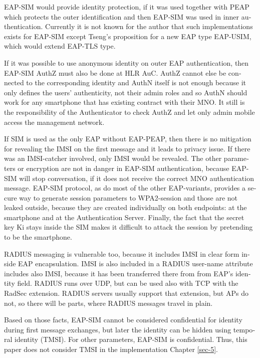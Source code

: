 \documentclass[12pt,a4paper,english]{tutthesis}
\begin{document}
\begin{otherlanguage}{english}
EAP-SIM would provide identity protection, if it was used together
with PEAP which protects the outer identification  and
then EAP-SIM was used in inner authentication.
Currently it is not known for the author that such implementations exists for
EAP-SIM  except Tseng's proposition\cite{tseng-usim} for a new EAP type
EAP-USIM, which would extend EAP-TLS type.

If it was possible to use anonymous identity on outer EAP
authentication, then EAP-SIM AuthZ must also be done at HLR AuC.
AuthZ cannot else be connected to the corresponding
identity and AuthN itself is not enough because it only defines the users'
authenticity, not their admin roles and so 
AuthN should work for any  smartphone that has existing contract with
their MNO. 
It still is the responsibility of the Authenticator to 
check AuthZ  and let only admin mobile access the management network.

If SIM is used as the only EAP without EAP-PEAP, then there is no
mitigation for revealing the IMSI on the first message and it leads to
privacy issue.  If there was an IMSI-catcher involved, only IMSI would
be revealed.  The other parameters or encryption are not in danger in
EAP-SIM authentication, because EAP-SIM will stop conversation, if it
does not receive the correct MNO authentication message.  EAP-SIM
protocol, as do most of the other EAP-variants, provides a secure way
to generate session parameters to WPA2-session and those are not
leaked outside, because they are created individually on both
endpoints: at the smartphone and at the Authentication Server.
Finally, the fact that the secret key Ki stays inside the SIM makes it
difficult to attack the session by pretending to be the smartphone.






RADIUS messaging is vulnerable too, because it includes IMSI in clear form 
inside EAP encapsulation. IMSI is also included in a RADIUS user-name
attribute includes also IMSI, because it has been transferred there from
from EAP's identity field.
RADIUS runs over UDP, but can be used also with TCP with the RadSec
extension. RADIUS servers usually support that extension, but APs do not, so 
there will be parts, where RADIUS messages travel in plain.




Based on those facts, EAP-SIM cannot be considered confidential for identity
during first message exchanges, but later the identity can be hidden
using temporal identity (TMSI). 
For other parameters, EAP-SIM is confidential.
Thus, this paper does not consider TMSI in the implementation Chapter
\ref{sec-5}.

\end{otherlanguage}
\end{document}
